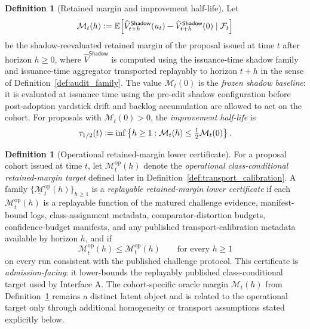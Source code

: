 \documentclass[11pt]{article}
\theoremstyle{definition}
\newtheorem{definition}[theorem]{Definition}
\newcommand{\E}{\mathbb{E}}
\newcommand{\1}{\mathbf{1}}
\newcommand{\Defeq}{\vcentcolon=}
\newcommand{\Shadow}{\mathsf{Shadow}}
\begin{document}
\begin{definition}[Retained margin and improvement half-life]\label{def:retained_margin}
Let
\[
\mathcal M_t(h)
\Defeq
\E\!\left[
\widehat V_{t+h}^{\Shadow}(u_t)-\widehat V_{t+h}^{\Shadow}(0)
\mid \mathcal F_t
\right]
\]
be the shadow-reevaluated retained margin of the proposal issued at time $t$ after horizon $h\ge0$, where $\widehat V^{\Shadow}$ is computed using the issuance-time shadow family and issuance-time aggregator transported replayably to horizon $t+h$ in the sense of Definition~\ref{def:audit_family}. The value $\mathcal M_t(0)$ is the \emph{frozen shadow baseline}: it is evaluated at issuance time using the pre-edit shadow configuration before post-adoption yardstick drift and backlog accumulation are allowed to act on the cohort. For proposals with $\mathcal M_t(0)>0$, the \emph{improvement half-life} is
\[
\tau_{1/2}(t)\Defeq \inf\left\{h\ge1:\mathcal M_t(h)\le \tfrac12 \mathcal M_t(0)\right\}.
\]
\end{definition}

\begin{definition}[Operational retained-margin lower certificate]\label{def:retained_margin_cert}
For a proposal cohort issued at time $t$, let $\mathcal M_t^{\mathrm{op}}(h)$ denote the \emph{operational class-conditional retained-margin target} defined later in Definition~\ref{def:transport_calibration}. A family $\{\underline{\mathcal M}_t^{\mathrm{op}}(h)\}_{h\ge 1}$ is a \emph{replayable retained-margin lower certificate} if each $\underline{\mathcal M}_t^{\mathrm{op}}(h)$ is a replayable function of the matured challenge evidence, manifest-bound logs, class-assignment metadata, comparator-distortion budgets, confidence-budget manifests, and any published transport-calibration metadata available by horizon $h$, and if
\[
\underline{\mathcal M}_t^{\mathrm{op}}(h)\le \mathcal M_t^{\mathrm{op}}(h)
\qquad\text{for every }h\ge 1
\]
on every run consistent with the published challenge protocol. This certificate is \emph{admission-facing}: it lower-bounds the replayably published class-conditional target used by Interface A. The cohort-specific oracle margin $\mathcal M_t(h)$ from Definition~\ref{def:retained_margin} remains a distinct latent object and is related to the operational target only through additional homogeneity or transport assumptions stated explicitly below.
\end{definition}
\end{document}
